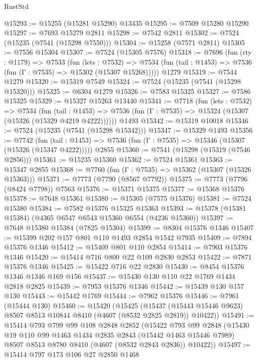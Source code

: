 \begin{lexlean}{RustStd}
\begin{coremodule}
@15293 := @15255 (@15281 @15290) @13435
@15295 := @7509 @15280 @15290
@15297 := @7693 @15279 @2811
@15298 := @7542 @2811
@15302 := @7524 (@15235 (@7541 (@15298 @7550)))
@15304 := @15258 (@7571 @2811)
@15305 := @7556 @15304
@15307 := @7524 (@15305 @7576)
@15318 := @7696
    (fun (rty : @1179) =>
    @7533
      (fun (lets : @7532) =>
      @7534 (fun (tail : @1453) => @7536 (fun (Γ : @7535) => @15302 (@15307 @15268)))))
    @1279
@15319 := @7544 @1279
@15320 := @15319 @7549
@15324 := @7524 (@15235 (@7541 (@15298 @15320)))
@15325 := @6304 @1279
@15326 := @7583 @15325
@15327 := @7586 @15325
@15329 := @15327 @15263 @13440
@15341 := @7718
    (fun (lets : @7532) =>
    @7534
      (fun (tail : @1453) =>
      @7536 (fun (Γ : @7535) => @15324 (@15307 (@15326 (@15329 @4219 @4222))))))
    @1493
@15342 := @15319 @10018
@15346 := @7524 (@15235 (@7541 (@15298 @15342)))
@15347 := @15329 @1493
@15356 := @7742
    (fun (tail : @1453) => @7536 (fun (Γ : @7535) => @15346 (@15307 (@15326 (@15347 @4222)))))
    @2855
@15360 := @7541 (@15298 (@15319 (@7546 @2856)))
@15361 := @15235 @15360
@15362 := @7524 @15361
@15363 := @15347 @2855
@15368 := @7760 (fun (Γ : @7535) => @15362 (@15307 (@15326 @15363)))
@15371 := @7773 (@7790 (@8567 @7792))
@15375 := @7773 (@7796 (@8424 @7798)) @7563
@15376 := @15371 @15375
@15377 := @15368 @15376
@15378 := @7648 @15361
@15380 := @15305 (@7575 @15376)
@15381 := @7524 @15380
@15384 := @7582 @15376 @15325 @15363
@15393 := @15378 (@15381 @15384) (@4365 @6547 @6543 @15360 @6554 (@4236 @15360))
@15397 := @7648 @15380 @15384 (@7825 @15304)
@15399 := @8304 @15376 @1346
@15407 := @15399 @202 @157 @801 @110 @1493 @2854 @1542 @7935
@15409 := @7894 @15376 @1346
@15412 := @15409 @801 @110 @2854
@15414 := @7903 @15376 @1346
@15420 := @15414 @716 @800 @22 @109 @2830 @2853
@15422 := @7871 @15376 @1346
@15425 := @15422 @716 @22 @2830
@15430 := @8454 @15376 @1346 @1346 @169 @156
@15437 := @15430 @130 @110 @22 @1769 @1434 @2818 @2825
@15439 := @7953 @15376 @1346
@15442 := @15439 @130 @157 @130
@15443 := @15442 @1769
@15444 := @7962 @15376
@15446 := @7961 (@15444 @130)
@15460 := @15420
    (@15425
      (@15437 (@15443 @15446 @9623) @8507 @8513 @10844 @8410 (@4607 (@8532 @2825 @2819)) @10422))
@15491 := @15414
    @793
    @799
    @99
    @108
    @2848
    @2852
    (@15422
      @793
      @99
      @2848
      (@15430
        @19
        @110
        @99
        @1463
        @1434
        @2835
        @2843
        (@15442 @1463 @15446 @7989)
        @8507
        @8513
        @8780
        @8410
        (@4607 (@8532 @2843 @2836))
        @10422))
@15497 := @15414 @797 @173 @106 @27 @2850 @1468

\end{coremodule}
\end{lexlean}

